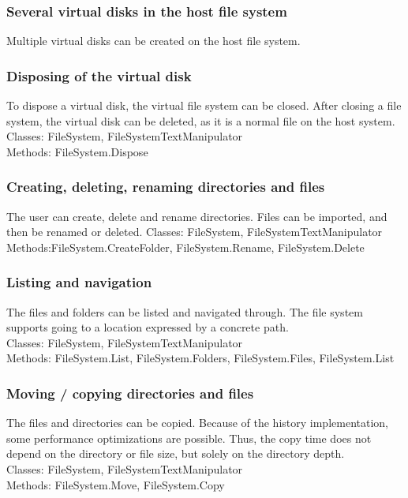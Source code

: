 \documentclass[JCDReport.tex]{subfiles}
\begin{document}
\subsubsection{Several virtual disks in the host file system}
Multiple virtual disks can be created on the host file system.

\subsubsection{Disposing of the virtual disk}
To dispose a virtual disk, the virtual file system can be closed. After closing a file system, the virtual disk can be deleted, as it is a normal file on the host system.\\
Classes: FileSystem, FileSystemTextManipulator\\
Methods: FileSystem.Dispose

\subsubsection{Creating, deleting, renaming directories and files}
The user can create, delete and rename directories. Files can be imported, and then be renamed or deleted.
Classes: FileSystem, FileSystemTextManipulator\\
Methods:FileSystem.CreateFolder, FileSystem.Rename, FileSystem.Delete

\subsubsection{Listing and navigation}
The files and folders can be listed and navigated through. The file system supports going to a location expressed by a concrete path.\\
Classes: FileSystem, FileSystemTextManipulator\\
Methods: FileSystem.List, FileSystem.Folders, FileSystem.Files, FileSystem.List

\subsubsection{Moving / copying directories and files}
The files and directories can be copied. Because of the history implementation, some performance optimizations are possible. Thus, the copy time does not depend on the directory or file size, but solely on the directory depth.\\
Classes: FileSystem, FileSystemTextManipulator\\
Methods: FileSystem.Move, FileSystem.Copy
\end{document}

